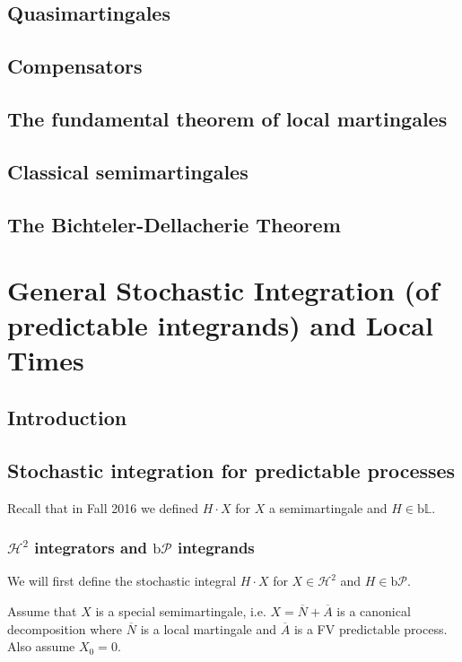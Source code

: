 \documentclass[openany,oneside]{book}
\theoremstyle{definition}
\theoremstyle{remark}
\newcommand{\sH}[1][2]{\mathcal{H}^{#1}} %
\newcommand{\pred}{\mathcal{P}} %
\newcommand{\bP}{\mathrm{b}\pred} %
\renewcommand{\L}{\mathbb{L}} %
\newcommand{\bL}{\mathrm{b}\L} %
\begin{document}
\section{Quasimartingales}

\section{Compensators}

\section{The fundamental theorem of local martingales}

\section{Classical semimartingales}

\section{The Bichteler-Dellacherie Theorem}


\chapter{General Stochastic Integration (of predictable integrands) and Local Times}

\section{Introduction}

\section{Stochastic integration for predictable processes}
Recall that in Fall 2016 we defined $H\cdot X$ for $X$ a semimartingale and $H\in \bL$.

\subsection{$\sH$ integrators and $\bP$ integrands}
We will first define the stochastic integral $H\cdot X$ for $X\in \sH$ and $H\in \bP$.

\par
Assume that $X$ is a special semimartingale, i.e. $X=\overline{N}+\overline{A}$ is a canonical decomposition where $\overline{N}$ is a local martingale and $\overline{A}$ is a FV predictable process. Also assume $X_0=0$.
\end{document}
